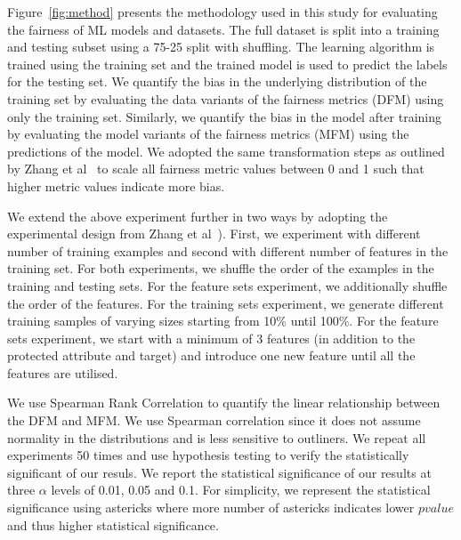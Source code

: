 \documentclass{article}
\begin{document}
Figure \ref{fig:method} presents the methodology used in this study
for evaluating the fairness of ML models and datasets. The full
dataset is split into a training and testing subset using a 75-25
split with shuffling. The learning algorithm is trained using the
training set and the trained model is used to predict the labels for
the testing set. We quantify the bias in the underlying distribution
of the training set by evaluating the data variants of the fairness
metrics (DFM) using only the training set. Similarly, we quantify the
bias in the model after training by evaluating the model variants of
the fairness metrics (MFM) using the predictions of the model. We
adopted the same transformation steps as outlined by Zhang et
al \cite{zhang2021ignorance} to scale all fairness metric values
between 0 and 1 such that higher metric values indicate more bias.


We extend the above experiment further in two ways by adopting the
experimental design from Zhang et al \cite{zhang2021ignorance}).
First, we experiment with different number of training examples and
second with different number of features in the training set. For both
experiments, we shuffle the order of the examples in the training and
testing sets. For the feature sets experiment, we additionally shuffle
the order of the features. For the training sets experiment, we
generate different training samples of varying sizes starting from
10\% until 100\%. For the feature sets experiment, we start with a
minimum of 3 features (in addition to the protected attribute and
target) and introduce one new feature until all the features are
utilised.

We use Spearman Rank Correlation to quantify the linear relationship
between the DFM and MFM. We use Spearman correlation since it does not
assume normality in the distributions and is less sensitive to
outliners. We repeat all experiments 50 times and use hypothesis
testing to verify the statistically significant of our resuls. We
report the statistical significance of our results at three $\alpha$
levels of 0.01, 0.05 and 0.1. For simplicity, we represent the
statistical significance using astericks where more number of
astericks indicates lower $pvalue$ and thus higher statistical
significance.

\end{document}
